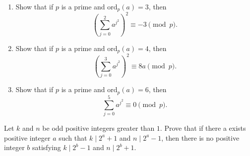 \documentclass{subfile}
\begin{document}
	\begin{problem}
		$ $
		\begin{enumerate}
			\item Show that if $p$ is a prime and $\text{ord}_p(a)=3$, then \[\left(\sum_{j=0}^{2}a^{j^{2}}\right)^{2}\equiv{-3}\pmod{p}.\]

			\item Show that if $p$ is a prime and $\text{ord}_p(a)=4$, then \[\left(\sum_{j=0}^{3}a^{j^{2}}\right)^{2}\equiv{8a}\pmod{p}.\]

			\item Show that if $p$ is a prime and $\text{ord}_p(a)=6$, then \[\sum_{j=0}^{5}a^{j^{2}}\equiv{0}\pmod{p}.\]
		\end{enumerate}
	\end{problem}


	\begin{problem}[Poland 2016]
		Let $k$ and $n$ be odd positive integers greater than $1$. Prove that if there a exists positive integer $a$ such that $k \mid 2^a+1$ and $n \mid 2^a-1$, then there is no positive integer $b$ satisfying $k \mid 2^b-1$ and  $n \mid 2^b+1$. %
	\end{problem}

\end{document}
